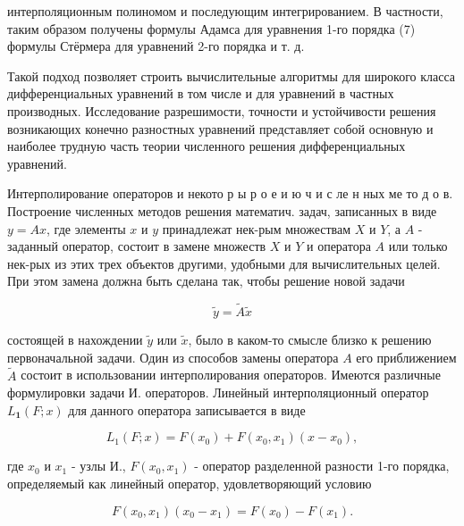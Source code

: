 \documentclass[10pt]{article}
\begin{document}
интерполяционным полиномом и последующим интегрированием. В частности, таким образом получены формулы Адамса для уравнения 1-го порядка (7) формулы Стёрмера для уравнений 2-го порядка и т. д.



Такой подход позволяет строить вычислительные алгоритмы для широкого класса дифференциальных уравнений в том числе и для уравнений в частных производных. Исследование разрешимости, точности и устойчивости решения возникающих конечно разностных уравнений представляет собой основную и наиболее трудную часть теории численного решения дифференциальных уравнений.



Интерполирование операторов и некото р ы р о е и ю ч и с ле н ных ме то д о в. Построение численных методов решения математич. задач, записанных в виде $y=A x$, где элементы $x$ и $y$ принадлежат нек-рым множествам $X$ и $Y$, а $A$ - заданный оператор, состоит в замене множеств $X$ и $Y$ и оператора $A$ или только нек-рых из этих трех объектов другими, удобными для вычислительных целей. При этом замена должна быть сделана так, чтобы решение новой задачи



\[

\tilde{y}=\tilde{A} \tilde{x}

\]



состоящей в нахождении $\tilde{y}$ или $\tilde{x}$, было в каком-то смысле близко к решению первоначальной задачи. Один из способов замены оператора $A$ его приближением $\tilde{A}$ состоит в использовании интерполирования операторов. Имеются различные формулировки задачи И. операторов. Линейный интерполяционный оператор $L_{\mathbf{1}}(F ; x)$ для данного оператора записывается в виде



\[

L_{1}(F ; x)=F\left(x_{0}\right)+F\left(x_{0}, x_{1}\right)\left(x-x_{0}\right),

\]



где $x_{0}$ и $x_{1}$ - узлы И., $F\left(x_{0}, x_{1}\right)$ - оператор разделенной разности 1-го порядка, определяемый как линейный оператор, удовлетворяющий условию



\[

F\left(x_{0}, x_{1}\right)\left(x_{0}-x_{1}\right)=F\left(x_{0}\right)-F\left(x_{1}\right) .

\]
\end{document}
